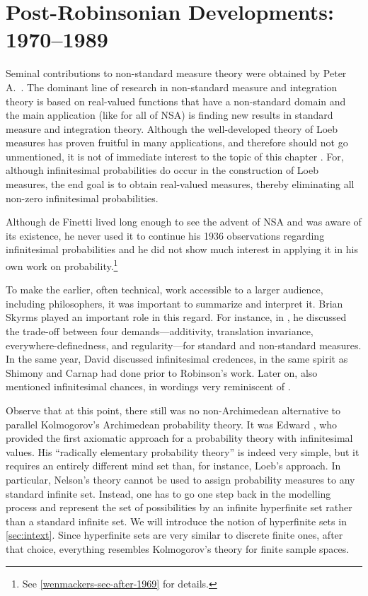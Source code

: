 \section{Post-Robinsonian Developments: 1970--1989}\label{sec:postR}
Seminal contributions to non-standard measure theory were obtained by Peter A.~\citet{Loeb:1975}. The dominant line of research in non-standard measure and integration theory is based on real-valued functions that have a non-standard domain and the main application (like for all of NSA) is finding new results in standard measure and integration theory.
Although the well-developed theory of Loeb measures has proven fruitful in many applications, and therefore should not go unmentioned, it is not of immediate interest to the topic of this chapter \citep[but see][]{Herzberg:2007a,Herzberg:2010}. For, although infinitesimal probabilities do occur in the construction of Loeb measures, the end goal is to obtain real-valued measures, thereby eliminating all non-zero infinitesimal probabilities.

Although de Finetti lived long enough to see the advent of NSA and was aware of its existence, he never used it to continue his 1936 observations regarding infinitesimal probabilities and he did not show much interest in applying it in his own work on probability.\footnote{See \autoref{wenmackers-sec-after-1969} for details.}

To make the earlier, often technical, work accessible to a larger audience, including philosophers, it was important to summarize and interpret it. Brian Skyrms played an important role in this regard. For instance, in \citet[Appendix~4]{Skyrms:1980}, he discussed the trade-off between four demands---additivity, translation invariance, everywhere-definedness, and regularity---for standard and non-standard measures. In the same year, David \citet{Lewis:1980} discussed infinitesimal credences, in the same spirit as Shimony and Carnap had done prior to Robinson's work. Later on, \citet{Lewis:1986specific} also mentioned infinitesimal chances, in wordings very reminiscent of \citet{BernsteinWattenberg:1969}.

Observe that at this point, there still was no non-Archimedean alternative to parallel Kolmogorov's Archimedean probability theory. It was Edward \citet{Nelson:1987}, who provided the first axiomatic approach for a probability theory with infinitesimal values. His ``radically elementary probability theory'' is indeed very simple, but it requires an entirely different mind set than, for instance, Loeb's approach. In particular, Nelson's theory cannot be used to assign probability measures to any standard infinite set. Instead, one has to go one step back in the modelling process and represent the set of possibilities by an infinite hyperfinite set rather than a standard infinite set. We will introduce the notion of hyperfinite sets in \autoref{sec:intext}. Since hyperfinite sets are very similar to discrete finite ones, after that choice, everything resembles Kolmogorov's theory for finite sample spaces.


